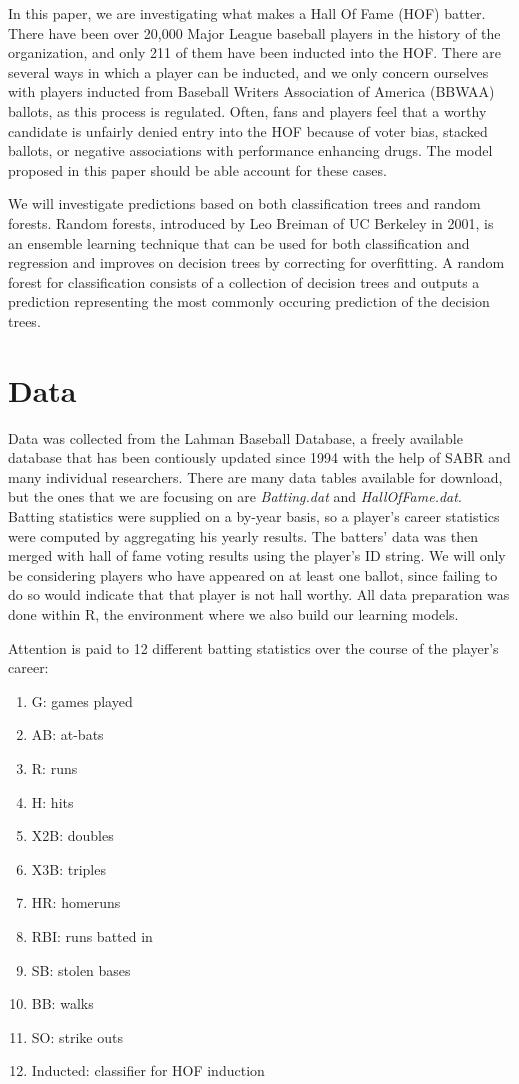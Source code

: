 \documentclass[preprint,12pt]{elsarticle}
\begin{document}
In this paper, we are investigating what makes a Hall Of Fame (HOF) batter. There have been over 20,000 Major League baseball players in the history of the organization, and only 211 of them have been inducted into the HOF. There are several ways in which a player can be inducted, and we only concern ourselves with players inducted from Baseball Writers Association of America (BBWAA) ballots, as this process is regulated. Often, fans and players feel that a worthy candidate is unfairly denied entry into the HOF because of voter bias, stacked ballots, or negative associations with performance enhancing drugs. The model proposed in this paper should be able account for these cases.

We will investigate predictions based on both classification trees and random forests. Random forests, introduced by Leo Breiman of UC Berkeley in 2001, is an ensemble learning technique that can be used for both classification and regression and improves on decision trees by correcting for overfitting. A random forest for classification consists of a collection of decision trees and outputs a prediction representing the most commonly occuring prediction of the decision trees.

\section{Data}
\label{S:2}
Data was collected from the Lahman Baseball Database, a freely available database that has been contiously updated since 1994 with the help of SABR and many individual researchers. There are many data tables available for download, but the ones that we are focusing on are \textit{Batting.dat} and \textit{HallOfFame.dat}. Batting statistics were supplied on a by-year basis, so a player's career statistics were computed by aggregating his yearly results. The batters' data was then merged with hall of fame voting results using the player's ID string. We will only be considering players who have appeared on at least one ballot, since failing to do so would indicate that that player is not hall worthy. All data preparation was done within R, the environment where we also build our learning models. 

Attention is paid to 12 different batting statistics over the course of the player's career:

\begin{enumerate}
	\item G: games played
	\item AB: at-bats
	\item R: runs
	\item H: hits
	\item X2B: doubles
	\item X3B: triples
	\item HR: homeruns
	\item RBI: runs batted in
	\item SB: stolen bases
	\item BB: walks
	\item SO: strike outs
	\item Inducted: classifier for HOF induction
\end{enumerate}
\end{document}
